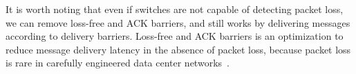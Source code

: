 {It is worth noting that even if switches are not capable of detecting packet loss, we can remove loss-free and ACK barriers, and \sys still works by delivering messages according to delivery barriers.
Loss-free and ACK barriers is an optimization to reduce message delivery latency in the absence of packet loss, because packet loss is rare in carefully engineered data center networks~\cite{ports2015designing}.






}

